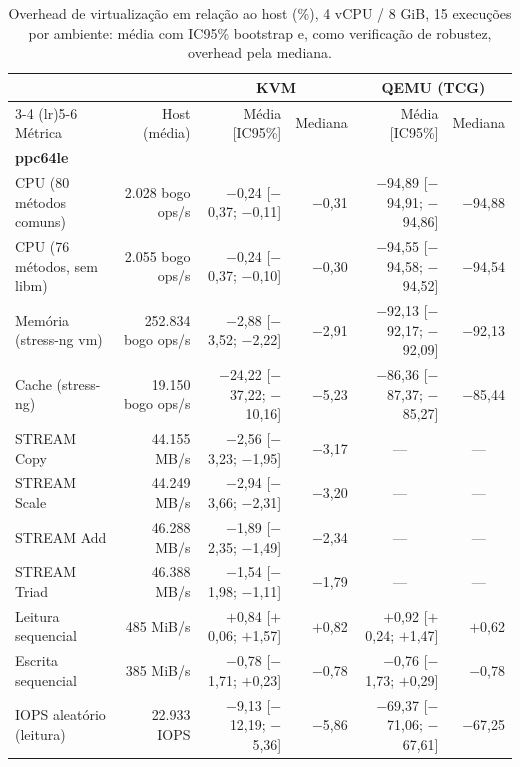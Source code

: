 \begin{table}[htbp]
\centering
\small
\begin{threeparttable}
\caption{Overhead de virtualização em relação ao host (\%), 4 vCPU / 8 GiB, 15 execuções por ambiente: média com IC95\% bootstrap e, como verificação de robustez, overhead pela mediana.}
\label{tab:overhead-4c8g}
\begin{tabular}{lrrrrr}
\toprule
 & & \multicolumn{2}{c}{KVM} & \multicolumn{2}{c}{QEMU (TCG)} \\
\cmidrule(lr){3-4} \cmidrule(lr){5-6}
Métrica & Host (média) & Média [IC95\%] & Mediana & Média [IC95\%] & Mediana \\
\midrule
\multicolumn{6}{l}{\textbf{ppc64le}} \\
CPU (80 métodos comuns) & 2.028 bogo ops/s & $-$0,24 [$-$0,37; $-$0,11] & $-$0,31 & $-$94,89 [$-$94,91; $-$94,86] & $-$94,88 \\
CPU (76 métodos, sem libm)\tnote{a} & 2.055 bogo ops/s & $-$0,24 [$-$0,37; $-$0,10] & $-$0,30 & $-$94,55 [$-$94,58; $-$94,52] & $-$94,54 \\
Memória (stress-ng vm) & 252.834 bogo ops/s & $-$2,88 [$-$3,52; $-$2,22] & $-$2,91 & $-$92,13 [$-$92,17; $-$92,09] & $-$92,13 \\
Cache (stress-ng) & 19.150 bogo ops/s & $-$24,22\tnote{b} [$-$37,22; $-$10,16] & $-$5,23 & $-$86,36 [$-$87,37; $-$85,27] & $-$85,44 \\
STREAM Copy & 44.155 MB/s & $-$2,56 [$-$3,23; $-$1,95] & $-$3,17 & \multicolumn{1}{c}{---\tnote{e}} & \multicolumn{1}{c}{---} \\
STREAM Scale & 44.249 MB/s & $-$2,94 [$-$3,66; $-$2,31] & $-$3,20 & \multicolumn{1}{c}{---\tnote{e}} & \multicolumn{1}{c}{---} \\
STREAM Add & 46.288 MB/s & $-$1,89 [$-$2,35; $-$1,49] & $-$2,34 & \multicolumn{1}{c}{---\tnote{e}} & \multicolumn{1}{c}{---} \\
STREAM Triad & 46.388 MB/s & $-$1,54 [$-$1,98; $-$1,11] & $-$1,79 & \multicolumn{1}{c}{---\tnote{e}} & \multicolumn{1}{c}{---} \\
Leitura sequencial & 485 MiB/s & $+$0,84 [$+$0,06; $+$1,57] & $+$0,82 & $+$0,92 [$+$0,24; $+$1,47] & $+$0,62 \\
Escrita sequencial & 385 MiB/s & $-$0,78 [$-$1,71; $+$0,23] & $-$0,78 & $-$0,76 [$-$1,73; $+$0,29] & $-$0,78 \\
IOPS aleatório (leitura) & 22.933 IOPS & $-$9,13 [$-$12,19; $-$5,36] & $-$5,86 & $-$69,37 [$-$71,06; $-$67,61] & $-$67,25 \\

\end{tabular}
\end{threeparttable}
\end{table}
